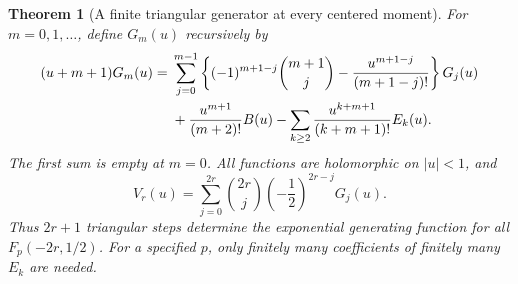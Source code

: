 \documentclass[11pt,a4paper]{article}
\numberwithin{equation}{section}
\newtheorem{theorem}{Theorem}[section]
\theoremstyle{definition}
\theoremstyle{remark}
\begin{document}
\begin{theorem}[A finite triangular generator at every centered moment]
\label{hpnew:generator}
For $m=0,1,\ldots$, define $G_m(u)$ recursively by
\begin{align}
 (u+m+1)G_m(u)
 ={}&\sum_{j=0}^{m-1}
 \left\{(-1)^{m+1-j}\binom{m+1}{j}
             -\frac{u^{m+1-j}}{(m+1-j)!}\right\}G_j(u)\notag\\
 &+\frac{u^{m+1}}{(m+2)!}B(u)
 -\sum_{k\ge2}\frac{u^{k+m+1}}{(k+m+1)!}E_k(u).
 \label{hpnew:Grecurrence}
\end{align}
The first sum is empty at $m=0$. All functions are holomorphic on
$|u|<1$, and
\begin{equation}\label{hpnew:Vrecurrence}
 \boxed{\displaystyle
 V_r(u)=\sum_{j=0}^{2r}\binom{2r}{j}
                     \left(-\frac12\right)^{2r-j}G_j(u).}
\end{equation}
Thus $2r+1$ triangular steps determine the exponential generating
function for all $F_p(-2r,1/2)$. For a specified $p$, only finitely
many coefficients of finitely many $E_k$ are needed.
\end{theorem}
\end{document}
